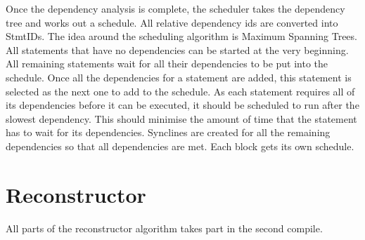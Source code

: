
Once the dependency analysis is complete, the scheduler takes the dependency tree and works out a schedule. All relative dependency ids are converted into StmtIDs. The idea around the scheduling algorithm is Maximum Spanning Trees. All statements that have no dependencies can be started at the very beginning. All remaining statements wait for all their dependencies to be put into the schedule. Once all the dependencies for a statement are added, this statement is selected as the next one to add to the schedule. As each statement requires all of its dependencies before it can be executed, it should be scheduled to run after the slowest dependency. This should minimise the amount of time that the statement has to wait for its dependencies. Synclines are created for all the remaining dependencies so that all dependencies are met. Each block gets its own schedule.

\section{Reconstructor}
All parts of the reconstructor algorithm takes part in the second compile.
